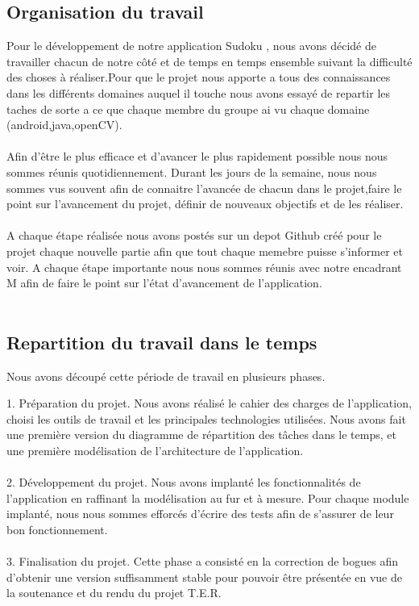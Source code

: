 \documentclass[8pt, french]{article}
\begin{document}
\subsection{Organisation du travail}
Pour le développement de notre application Sudoku , nous avons décidé de travailler chacun de notre côté et de temps en temps ensemble suivant la difficulté des choses à réaliser.Pour que le projet nous apporte a tous des connaissances dans les différents domaines auquel il touche nous avons essayé de repartir les taches de sorte a ce que chaque membre du groupe ai vu chaque domaine (android,java,openCV).\\\\
Afin d’être le plus efficace et d’avancer le plus rapidement possible nous nous sommes réunis
quotidiennement. Durant les jours de la semaine, nous nous sommes vus souvent afin de connaitre l'avancée de chacun dans le projet,faire le point sur l’avancement du projet, définir de nouveaux objectifs et de les réaliser.\\\\
A chaque étape réalisée nous avons postés sur un depot Github créé pour le projet chaque nouvelle partie afin que tout chaque memebre puisse s'informer et voir.
A chaque étape importante nous nous sommes réunis avec notre encadrant M afin de faire le point sur l’état d’avancement de l’application.\\\\

\subsection{Repartition du travail dans le temps}

Nous avons découpé cette période de travail en plusieurs phases.

1. Préparation du projet. Nous avons réalisé le cahier des charges de l’application, choisi les
outils de travail et les principales technologies utilisées. Nous avons fait une première version
du diagramme de répartition des tâches dans le temps, et une première modélisation de
l’architecture de l’application.\\\\
2. Développement du projet. Nous avons implanté les fonctionnalités de l’application en
raffinant la modélisation au fur et à mesure. Pour chaque module implanté, nous nous sommes
efforcés d’écrire des tests afin de s’assurer de leur bon fonctionnement.\\\\
3. Finalisation du projet. Cette phase a consisté en la correction de bogues afin d’obtenir une
version suffisamment stable pour pouvoir être présentée en vue de la soutenance et du rendu
du projet T.E.R. \\
\end{document}
